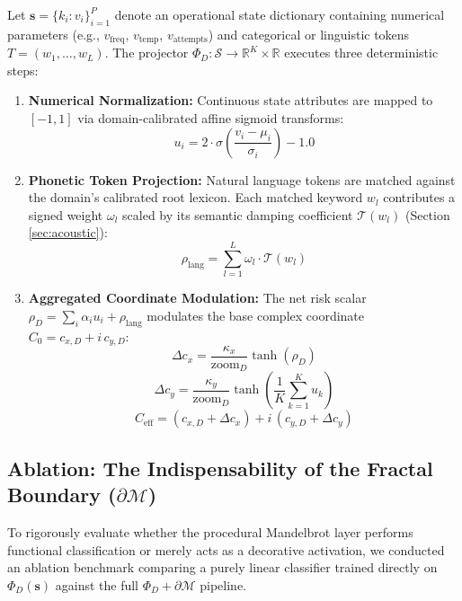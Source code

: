 \documentclass[10pt,journal,compsoc,twocolumn]{article}
\begin{document}
Let $\mathbf{s} = \{k_i: v_i\}_{i=1}^P$ denote an operational state dictionary containing numerical parameters (e.g., $v_{\text{freq}}$, $v_{\text{temp}}$, $v_{\text{attempts}}$) and categorical or linguistic tokens $T = (w_1, \dots, w_L)$. The projector $\Phi_D: \mathcal{S} \to \mathbb{R}^K \times \mathbb{R}$ executes three deterministic steps:
\begin{enumerate}
    \item \textbf{Numerical Normalization:} Continuous state attributes are mapped to $[-1, 1]$ via domain-calibrated affine sigmoid transforms:
    \begin{equation}
    u_i = 2 \cdot \sigma\left( \frac{v_i - \mu_i}{\sigma_i} \right) - 1.0
    \end{equation}
    \item \textbf{Phonetic Token Projection:} Natural language tokens are matched against the domain's calibrated root lexicon. Each matched keyword $w_l$ contributes a signed weight $\omega_l$ scaled by its semantic damping coefficient $\mathcal{T}(w_l)$ (Section \ref{sec:acoustic}):
    \begin{equation}
    \rho_{\text{lang}} = \sum_{l=1}^L \omega_l \cdot \mathcal{T}(w_l)
    \end{equation}
    \item \textbf{Aggregated Coordinate Modulation:} The net risk scalar $\rho_D = \sum_{i} \alpha_i u_i + \rho_{\text{lang}}$ modulates the base complex coordinate $C_0 = c_{x, D} + i\, c_{y, D}$:
    \begin{equation}
    \Delta c_x = \frac{\kappa_x}{\text{zoom}_D} \tanh(\rho_D)
    \end{equation}
    \begin{equation}
    \Delta c_y = \frac{\kappa_y}{\text{zoom}_D} \tanh\left(\frac{1}{K}\sum_{k=1}^K u_k\right)
    \end{equation}
    \begin{equation}
    C_{\text{eff}} = (c_{x, D} + \Delta c_x) + i\, (c_{y, D} + \Delta c_y)
    \end{equation}
\end{enumerate}

\subsection{Ablation: The Indispensability of the Fractal Boundary ($\partial \mathcal{M}$)}
To rigorously evaluate whether the procedural Mandelbrot layer performs functional classification or merely acts as a decorative activation, we conducted an ablation benchmark comparing a purely linear classifier trained directly on $\Phi_D(\mathbf{s})$ against the full $\Phi_D + \partial \mathcal{M}$ pipeline. 
\end{document}
